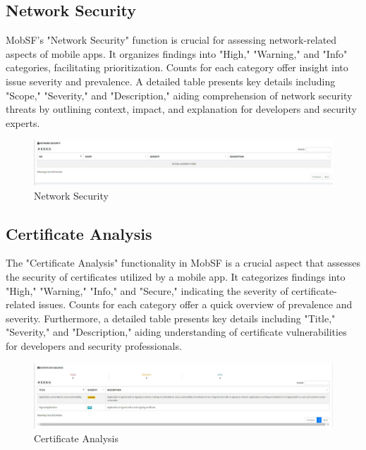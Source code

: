 \documentclass{report}
\begin{document}
\subsection{Network Security}
MobSF's "Network Security" function is crucial for assessing network-related aspects of mobile apps. It organizes findings into "High," "Warning," and "Info" categories, facilitating prioritization. Counts for each category offer insight into issue severity and prevalence. A detailed table presents key details including "Scope," "Severity," and "Description," aiding comprehension of network security threats by outlining context, impact, and explanation for developers and security experts.
\begin{figure}[hbt!]
        \centering
        \includegraphics[width=1\textwidth]{images/networksecu.jpg}
        \caption{Network Security}
        \label{fig:example}
\end{figure}
\FloatBarrier

\subsection{Certificate Analysis}
The "Certificate Analysis" functionality in MobSF is a crucial aspect that assesses the security of certificates utilized by a mobile app. It categorizes findings into "High," "Warning," "Info," and "Secure," indicating the severity of certificate-related issues. Counts for each category offer a quick overview of prevalence and severity. Furthermore, a detailed table presents key details including "Title," "Severity," and "Description," aiding understanding of certificate vulnerabilities for developers and security professionals.
\begin{figure}[hbt!]
    \centering
    \includegraphics[width=1\textwidth]{images/certificate_analysis.jpg}
    \caption{Certificate Analysis}
    \label{fig:example}
\end{figure}
\FloatBarrier
\end{document}
